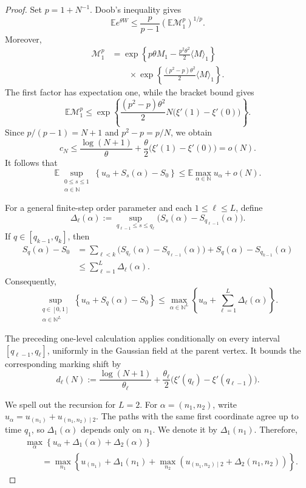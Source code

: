 \documentclass[a4paper,10pt,reqno]{amsart}
\numberwithin{equation}{section}
\newcommand{\dN}{\mathbb{N}}%
\newcommand{\dE}{\mathbb{E}}%
\begin{document}
\begin{proof}
		Set $p=1+N^{-1}$. Doob's inequality gives
		\[
		\dE e^{\theta W}
		\le
		\frac p{p-1}
		\left(
		\dE\mathcal M_1^p
		\right)^{1/p}.
		\]
		Moreover,
		\[
		\begin{aligned}
			\mathcal M_1^p
			&=
			\exp\left\{
			p\theta M_1
			-
			\frac{p^2\theta^2}{2}
			\langle M\rangle_1
			\right\}
			\\
			&\qquad\times
			\exp\left\{
			\frac{(p^2-p)\theta^2}{2}
			\langle M\rangle_1
			\right\}.
		\end{aligned}
		\]
		The first factor has expectation one, while the bracket bound gives
		\[
		\dE\mathcal M_1^p
		\le
		\exp\left\{
		\frac{(p^2-p)\theta^2}{2}
		N\bigl(\xi'(1)-\xi'(0)\bigr)
		\right\}.
		\]
		Since $p/(p-1)=N+1$ and $p^2-p=p/N$, we obtain
		\[
		c_N
		\le
		\frac{\log(N+1)}{\theta}
		+
		\frac{\theta}{2}
		\bigl(\xi'(1)-\xi'(0)\bigr)
		=
		o(N).
		\]
		It follows that
		\[
		\dE
		\sup_{\substack{0\le s\le1\\ \alpha\in\dN}}
		\left\{
		u_\alpha+S_s(\alpha)-S_0
		\right\}
		\le
		\dE\max_{\alpha\in\dN}u_\alpha+o(N).
		\]
		
		For a general finite-step order parameter and each
		$1\le\ell\le L$, define
		\[
		\Delta_\ell(\alpha)
		:=
		\sup_{q_{\ell-1}\le s\le q_\ell}
		\bigl(
		S_s(\alpha)-S_{q_{\ell-1}}(\alpha)
		\bigr).
		\]
		If $q\in[q_{k-1},q_k]$, then
		\begin{equation}\label{eq:splitting}
			\begin{aligned}
				S_q(\alpha)-S_0
				&=
				\sum_{\ell<k}
				\bigl(
				S_{q_\ell}(\alpha)-S_{q_{\ell-1}}(\alpha)
				\bigr)
				+
				S_q(\alpha)-S_{q_{k-1}}(\alpha)
				\\
				&\le
				\sum_{\ell=1}^L \Delta_\ell(\alpha).
			\end{aligned}
		\end{equation}
		Consequently,
		\[
		\sup_{\substack{q\in[0,1]\\ \alpha\in\dN^L}}
		\left\{
		u_\alpha+S_q(\alpha)-S_0
		\right\}
		\le
		\max_{\alpha\in\dN^L}
		\left\{
		u_\alpha+\sum_{\ell=1}^L \Delta_\ell(\alpha)
		\right\}.
		\]
		
		The preceding one-level calculation applies conditionally on
		every interval $[q_{\ell-1},q_\ell]$, uniformly in the Gaussian
		field at the parent vertex. It bounds the corresponding marking
		shift by
		\[
		d_\ell(N)
		:=
		\frac{\log(N+1)}{\theta_\ell}
		+
		\frac{\theta_\ell}{2}
		\bigl(
		\xi'(q_\ell)-\xi'(q_{\ell-1})
		\bigr).
		\]
		
		We spell out the recursion for $L=2$. For
		$\alpha=(n_1,n_2)$, write
		$u_\alpha=u_{(n_1)}+u_{(n_1,n_2)\mid2}$. The paths with the
		same first coordinate agree up to time $q_1$, so
		$\Delta_1(\alpha)$ depends only on $n_1$. We denote it by
		$\Delta_1(n_1)$. Therefore,
		\[
		\begin{aligned}
			&\max_{\alpha}
			\left\{
			u_\alpha+\Delta_1(\alpha)+\Delta_2(\alpha)
			\right\}
			\\
			&\qquad=
			\max_{n_1}
			\left\{
			u_{(n_1)}+\Delta_1(n_1)
			+
			\max_{n_2}
			\left(
			u_{(n_1,n_2)\mid2}+\Delta_2(n_1,n_2)
			\right)
			\right\}.
		\end{aligned}
		\]
		

\end{proof}
\end{document}
